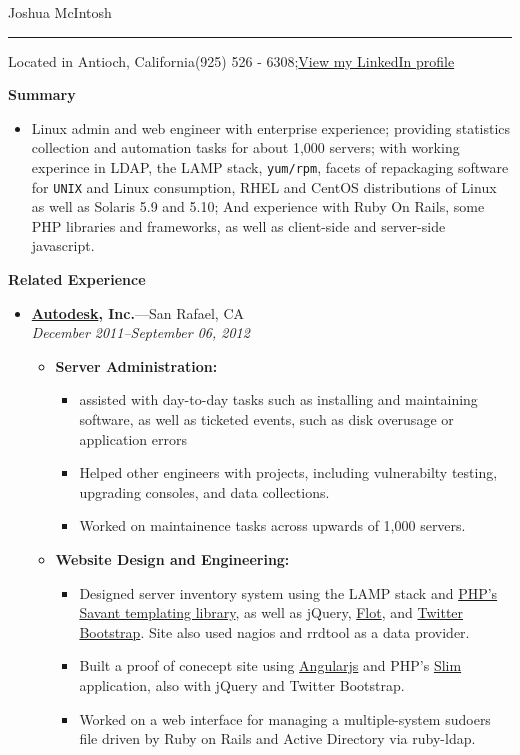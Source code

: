 \documentclass[11pt,oneside]{article}
\newcommand{\name}{Joshua McIntosh}
\newcommand{\addr}{Antioch, California}
\newcommand{\phone}{(925) 526 - 6308}
\newcommand{\email}{\href{http://www.linkedin.com/pub/joshua-mcintosh/57/b82/690}
{View my LinkedIn profile}}
\newcommand{\bigname}[1]{
		\begin{center}\huge{\myname #1}\end{center}
}
\newenvironment{ressection}[1]{
	\vspace{4pt}
	{\textbf{\LARGE {\bigtxt #1}}}
	\begin{itemize}
	\vspace{2pt}
}{
	\end{itemize}
}
\newcommand{\resitem}[1]{
	\vspace{2.1pt}
	\item \begin{flushleft} #1 \end{flushleft}
}
\newcommand{\resbigitem}[3]{
	\vspace{-5pt}
	\item
	\textbf{#1}---#2 \\
	\textit{#3}
}
\newenvironment{ressubsec}[3]{
	\resbigitem{#1}{#2}{#3}
	\vspace{-4pt}
	\begin{itemize}
}{
	\end{itemize}
}
\newenvironment{reslist}[1]{
	\resitem{\textbf{#1}}
	\vspace{0pt}
	\begin{itemize}
}{
	\end{itemize}
}
\begin{document}
\bigname{\name}

\vspace{-8pt} \rule{\textwidth}{.25pt}
\textsf{Located in \addr\hfill \phone;\hspace{4pt}\email}


\vspace{8 pt}

\begin{ressection}{Summary}
\item Linux admin and web engineer with enterprise experience; providing 
	statistics collection and automation tasks for about 1,000 servers; with
	working experince in LDAP, the LAMP stack, \texttt{yum/rpm}, facets of 
	repackaging software for \texttt{UNIX} and Linux consumption, RHEL and 
	CentOS distributions of Linux as well as Solaris 5.9 and 5.10; And 
	experience with Ruby On Rails, some PHP libraries and frameworks, as well as
	client-side and server-side javascript.
\end{ressection}
 
\begin{ressection}{Related Experience}

		\begin{ressubsec}{\href{http://usa.autodesk.com/}{\autodesk Autodesk}, Inc.}{San Rafael, CA}{December 
				2011--September 06, 2012}
				\begin{reslist}{Server Administration:}
						\resitem {assisted with day-to-day tasks such as 
						installing and maintaining software, as well as ticketed
						events, such as disk overusage or application errors}

						\resitem {Helped other engineers with projects, including 
						vulnerabilty testing, upgrading consoles, and data 
						collections.}

						\resitem {Worked on maintainence tasks across upwards of 
						1,000 servers.}

				\end{reslist}

				\begin{reslist}{Website Design and Engineering:}
						\resitem {Designed server inventory system using the
						LAMP stack and \href{http://phpsavant.com/}
						{PHP's Savant templating library}, as well as jQuery, 
						\href{http://people.iola.dk/olau/flot/examples}{Flot}, 
						and \href{http://twitter.github.com/bootstrap/index.html}
						{Twitter Bootstrap}. Site also used nagios and 
						rrdtool as a data provider.}

						\resitem {Built a proof of conecept site using 
						\href{http://angularjs.org/}{Angularjs}
						and PHP's \href{http://slimframework.com/}{Slim} 
						application, also with jQuery and Twitter 
						Bootstrap.}

						\resitem {Worked on a web interface for managing a 
						multiple-system sudoers file driven by Ruby on Rails 
						and Active Directory via ruby-ldap.}

				\end{reslist}

		\end{ressubsec}
\end{ressection}
\end{document}
